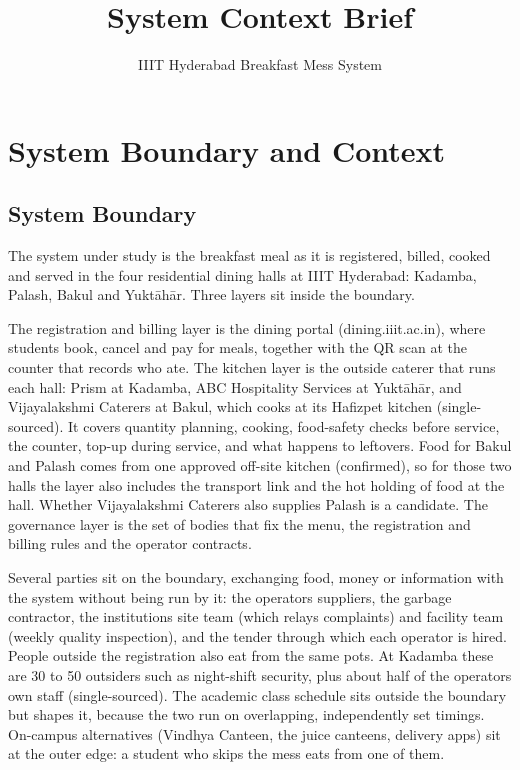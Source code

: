 \documentclass[
  10pt,
  table]{article}
\title{System Context Brief}
\subtitle{IIIT Hyderabad Breakfast Mess System}
\author{}
\date{}
\makeatletter
\gdef\psubtitle{}
\renewcommand{\maketitle}{%
  \begingroup\raggedright
  {\color{pblue}\fontsize{24}{27}\selectfont\bfseries \@title\par}
  \vspace{3pt}{\color{pblue}\rule{\linewidth}{2.4pt}}\par\vspace{5pt}
  {\color{pslate}\large \psubtitle\par}
  \vspace{4pt}
  \endgroup}
\makeatother
\begin{document}
\maketitle

\renewcommand*\contentsname{Contents}
{
\hypersetup{linkcolor=pslate}
\setcounter{tocdepth}{2}
\tableofcontents
}
\section{System Boundary and Context}\label{system-boundary-and-context}

\subsection{System Boundary}\label{system-boundary}

The system under study is the breakfast meal as it is registered, billed, cooked and served in the four residential dining halls at IIIT Hyderabad: Kadamba, Palash, Bakul and Yuktāhār. Three layers sit inside the boundary.

The registration and billing layer is the dining portal (dining.iiit.ac.in), where students book, cancel and pay for meals, together with the QR scan at the counter that records who ate. The kitchen layer is the outside caterer that runs each hall: Prism at Kadamba, ABC Hospitality Services at Yuktāhār, and Vijayalakshmi Caterers at Bakul, which cooks at its Hafizpet kitchen (single-sourced). It covers quantity planning, cooking, food-safety checks before service, the counter, top-up during service, and what happens to leftovers. Food for Bakul and Palash comes from one approved off-site kitchen (confirmed), so for those two halls the layer also includes the transport link and the hot holding of food at the hall. Whether Vijayalakshmi Caterers also supplies Palash is a candidate. The governance layer is the set of bodies that fix the menu, the registration and billing rules and the operator contracts.

Several parties sit on the boundary, exchanging food, money or information with the system without being run by it: the operators\textquotesingle{} suppliers, the garbage contractor, the institution\textquotesingle s site team (which relays complaints) and facility team (weekly quality inspection), and the tender through which each operator is hired. People outside the registration also eat from the same pots. At Kadamba these are 30 to 50 outsiders such as night-shift security, plus about half of the operator\textquotesingle s own staff (single-sourced). The academic class schedule sits outside the boundary but shapes it, because the two run on overlapping, independently set timings. On-campus alternatives (Vindhya Canteen, the juice canteens, delivery apps) sit at the outer edge: a student who skips the mess eats from one of them.
\end{document}
